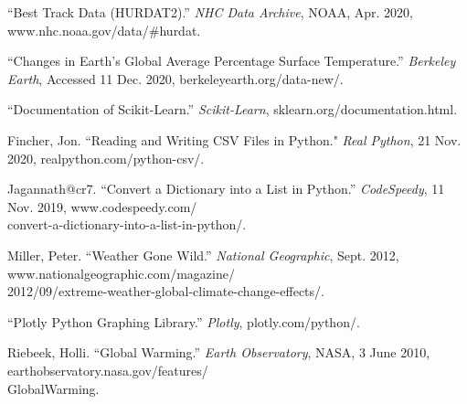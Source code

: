 \documentclass[fontsize=11pt]{article}
\begin{document}
\begin{hangparas}{0.5in}{1}

“Best Track Data (HURDAT2).” \textit{NHC Data Archive}, NOAA, Apr. 2020, www.nhc.noaa.gov/data/\#hurdat.

\bigskip

“Changes in Earth's Global Average Percentage Surface Temperature.” \textit{Berkeley Earth}, Accessed 11 Dec. 2020, berkeleyearth.org/data-new/.

\bigskip

“Documentation of Scikit-Learn.” \textit{Scikit-Learn}, sklearn.org/documentation.html.

\bigskip

Fincher, Jon. ``Reading and Writing CSV Files in Python." \textit{Real Python}, 21 Nov. 2020, realpython.com/python-csv/.

\bigskip

Jagannath@cr7. “Convert a Dictionary into a List in Python.” \textit{CodeSpeedy}, 11 Nov. 2019, www.codespeedy.com/\\convert-a-dictionary-into-a-list-in-python/.

\bigskip

Miller, Peter. “Weather Gone Wild.” \textit{National Geographic}, Sept. 2012, www.nationalgeographic.com/magazine/\\2012/09/extreme-weather-global-climate-change-effects/.

\bigskip

“Plotly Python Graphing Library.” \textit{Plotly}, plotly.com/python/.

\bigskip

Riebeek, Holli. “Global Warming.” \textit{Earth Observatory}, NASA, 3 June 2010, earthobservatory.nasa.gov/features/\\GlobalWarming.



\end{hangparas}
\end{document}
